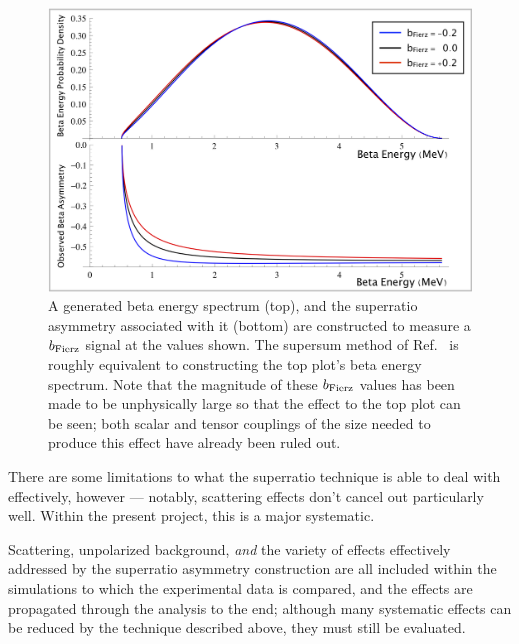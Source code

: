\begin{figure}[h!!tb]
	\centering
	\includegraphics[width=.999\linewidth]
	{Figures/Fierz_Signature.png}
	\caption[Generated Beta Energy Spectrum and Superratio Asymmetry to Measure $\bFierz$]{A generated beta energy spectrum (top), and the superratio asymmetry associated with it (bottom) are constructed to measure a $\bFierz$ signal at the values shown.  The supersum method of Ref.~\cite{UCNA_first_Fierz} is roughly equivalent to constructing the top plot's beta energy spectrum.  Note that the magnitude of these $\bFierz$ values has been made to be unphysically large so that the effect to the top plot can be seen; both scalar and tensor couplings of the size needed to produce this effect have already been ruled out. }	\label{fig:FierzSignature}
\end{figure}


There are some limitations to what the superratio technique is able to deal with effectively, however --- notably, scattering effects don't cancel out particularly well.  Within the present project, this is a major systematic.  

Scattering, unpolarized background, \emph{and} the variety of effects effectively addressed by the superratio asymmetry construction are all included within the simulations to which the experimental data is compared, and the effects are propagated through the analysis to the end;  although many systematic effects can be reduced by the technique described above, they must still be evaluated.








